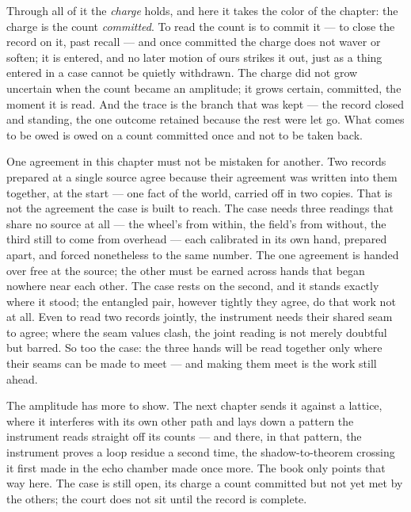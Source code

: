 Through all of it the \emph{charge} holds, and here it takes the color of the chapter: the charge is the count
\emph{committed}. To read the count is to commit it --- to close the record on it, past recall --- and once
committed the charge does not waver or soften; it is entered, and no later motion of ours strikes it out, just
as a thing entered in a case cannot be quietly withdrawn. The charge did not grow uncertain when the count
became an amplitude; it grows certain, committed, the moment it is read. And the trace is the branch that was
kept --- the record closed and standing, the one outcome retained because the rest were let go. What comes to be
owed is owed on a count committed once and not to be taken back.

One agreement in this chapter must not be mistaken for another. Two records prepared at a single source agree
because their agreement was written into them together, at the start --- one fact of the world, carried off in
two copies. That is not the agreement the case is built to reach. The case needs three readings that share no
source at all --- the wheel's from within, the field's from without, the third still to come from overhead ---
each calibrated in its own hand, prepared apart, and forced nonetheless to the same number. The one agreement is
handed over free at the source; the other must be earned across hands that began nowhere near each other. The
case rests on the second, and it stands exactly where it stood; the entangled pair, however tightly they agree,
do that work not at all. Even to read two records jointly, the instrument needs their shared seam to agree; where
the seam values clash, the joint reading is not merely doubtful but barred. So too the case: the three hands will
be read together only where their seams can be made to meet --- and making them meet is the work still ahead.

The amplitude has more to show. The next chapter sends it against a lattice, where it interferes with its own
other path and lays down a pattern the instrument reads straight off its counts --- and there, in that pattern,
the instrument proves a loop residue a second time, the shadow-to-theorem crossing it first made in the echo
chamber made once more. The book only points that way here. The case is still open, its charge a count committed
but not yet met by the others; the court does not sit until the record is complete.

